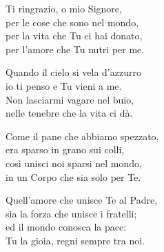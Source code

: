
\strofa Ti ringrazio, o mio Signore,\\
per le cose che sono nel mondo,\\
per la vita che Tu ci hai donato,\\
per l'amore che Tu nutri per me.

\spazio


\spazio

\strofa Quando il cielo si vela d'azzurro\\
io ti penso e Tu vieni a me.\\
Non lasciarmi vagare nel buio,\\
nelle tenebre che la vita ci dà.

\spazio


\spazio

\strofa Come il pane che abbiamo spezzato,\\
era sparso in grano sui colli,\\
così unisci noi sparsi nel mondo,\\
in un Corpo che sia solo per Te.

\spazio


\spazio

\strofa Quell'amore che unisce Te al Padre,\\
sia la forza che unisce i fratelli;\\
ed il mondo conosca la pace:\\
Tu la gioia, regni sempre tra noi.

\spazio

